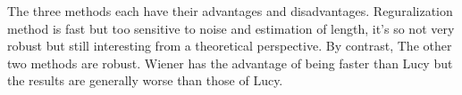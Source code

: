The three methods each have their advantages and disadvantages. Reguralization method is fast but too sensitive to noise and estimation of length, it's so not very robust but still interesting from a theoretical perspective. By contrast, The other two methods are robust. Wiener has the advantage of being faster than Lucy but the results are generally worse than those of Lucy.